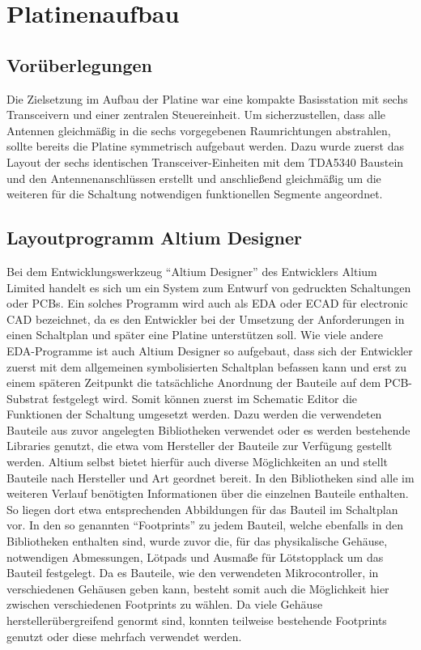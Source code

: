 \chapter{Platinenaufbau}
\label{sec:Platinenaufbau}
\pagestyle{scrheadings}

\section{Vorüberlegungen} 
Die Zielsetzung im Aufbau der Platine war eine kompakte Basisstation mit sechs Transceivern und einer zentralen Steuereinheit. Um sicherzustellen, dass alle Antennen gleichmäßig in die sechs vorgegebenen Raumrichtungen abstrahlen, sollte bereits die Platine symmetrisch aufgebaut werden. Dazu wurde zuerst das Layout der sechs identischen Transceiver-Einheiten mit dem TDA5340 Baustein und den Antennenanschlüssen erstellt und anschließend gleichmäßig um die weiteren für die Schaltung notwendigen funktionellen Segmente angeordnet.

 
\section{Layoutprogramm Altium Designer}
Bei dem Entwicklungswerkzeug \enquote{Altium Designer} des Entwicklers Altium Limited handelt es sich um ein System zum Entwurf von  gedruckten  Schaltungen oder \acp{PCB}. Ein solches Programm wird auch als \ac{EDA} oder ECAD für electronic \ac{CAD} bezeichnet, da es den Entwickler bei der Umsetzung der Anforderungen in einen Schaltplan und später eine Platine unterstützen soll.
Wie viele andere \ac{EDA}-Programme ist auch Altium Designer so aufgebaut, dass sich der Entwickler zuerst mit dem allgemeinen symbolisierten Schaltplan befassen kann und erst zu einem späteren Zeitpunkt die tatsächliche Anordnung der Bauteile auf dem \ac{PCB}-Substrat festgelegt wird. Somit können zuerst im Schematic Editor die Funktionen der Schaltung umgesetzt werden. Dazu werden die verwendeten Bauteile aus zuvor angelegten Bibliotheken verwendet oder es werden bestehende Libraries genutzt, die etwa vom Hersteller der Bauteile zur Verfügung gestellt werden. Altium selbst bietet hierfür auch diverse Möglichkeiten an und stellt Bauteile nach Hersteller und Art geordnet bereit.
In den Bibliotheken sind alle im weiteren Verlauf benötigten Informationen über die einzelnen Bauteile enthalten. So liegen dort etwa  entsprechenden Abbildungen für das Bauteil im  Schaltplan  vor. In den so genannten \enquote{Footprints} zu jedem Bauteil, welche ebenfalls in den Bibliotheken enthalten sind, wurde zuvor die, für das physikalische Gehäuse, notwendigen Abmessungen, Lötpads und Ausmaße für Lötstopplack um das Bauteil festgelegt. Da es Bauteile, wie den verwendeten  Mikrocontroller, in verschiedenen Gehäusen geben kann, besteht somit auch die Möglichkeit hier zwischen verschiedenen Footprints zu wählen. Da viele Gehäuse herstellerübergreifend genormt sind, konnten teilweise bestehende Footprints genutzt  oder diese mehrfach verwendet werden.



